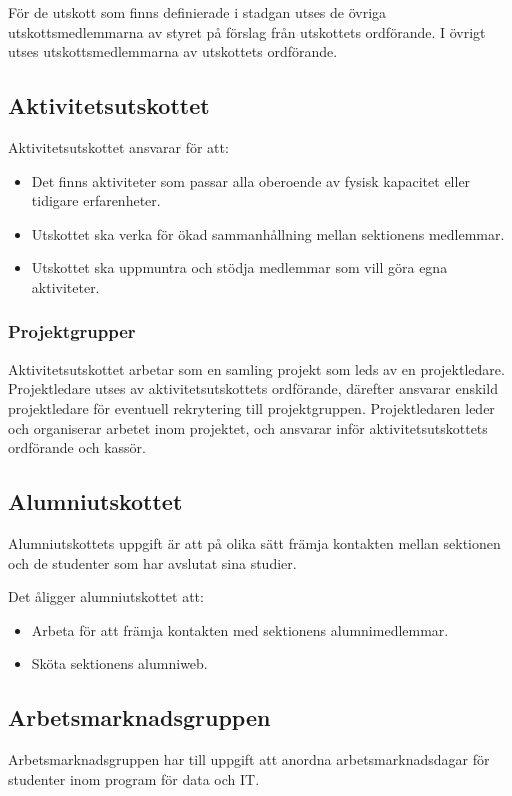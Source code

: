 \documentclass{datateknologsektionen-document}
\begin{document}
För de utskott som finns definierade i stadgan utses de övriga utskottsmedlemmarna av
styret på förslag från utskottets ordförande. I övrigt utses utskottsmedlemmarna av
utskottets ordförande.

\subsection{Aktivitetsutskottet}
Aktivitetsutskottet ansvarar för att:
\begin{itemize}
  \item Det finns aktiviteter som passar alla oberoende av fysisk kapacitet eller tidigare erfarenheter.
  \item Utskottet ska verka för ökad sammanhållning mellan sektionens medlemmar.
  \item Utskottet ska uppmuntra och stödja medlemmar som vill göra egna aktiviteter.
\end{itemize}

\subsubsection{Projektgrupper}
Aktivitetsutskottet arbetar som en samling projekt som leds av en projektledare.
Projektledare utses av aktivitetsutskottets ordförande, därefter ansvarar enskild
projektledare för eventuell rekrytering till projektgruppen. Projektledaren leder och
organiserar arbetet inom projektet, och ansvarar inför aktivitetsutskottets
ordförande och kassör.

\subsection{Alumniutskottet}
Alumniutskottets uppgift är att på olika sätt främja kontakten mellan sektionen
och de studenter som har avslutat sina studier.

Det åligger alumniutskottet att:
\begin{itemize}
  \item Arbeta för att främja kontakten med sektionens alumnimedlemmar.
  \item Sköta sektionens alumniweb.
\end{itemize}

\subsection{Arbetsmarknadsgruppen}
\label{arbetsmarknadsgruppen}
Arbetsmarknadsgruppen har till uppgift att anordna arbetsmarknadsdagar för studenter
inom program för data och IT.
\end{document}
